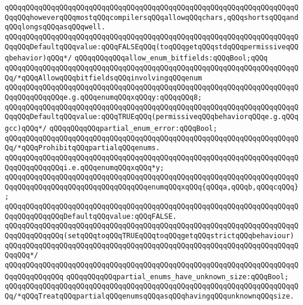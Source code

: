 \verb|qQQqqQQqqQQqqQQqqQQqqQQqqQQqqQQqqQQqqQQqqQQqqQQqqQQqqQQqqQQqqQQqqQQqqQQqqQQqhoweverqQQqmostqQQqcompilersqQQqallowqQQqchars,qQQqshortsqQQqandqQQqlongsqQQqasqQQqwell.|\newline
\verb|qQQqqQQqqQQqqQQqqQQqqQQqqQQqqQQqqQQqqQQqqQQqqQQqqQQqqQQqqQQqqQQqqQQqqQQqqQQqDefaultqQQqvalue:qQQqFALSEqQQq(toqQQqgetqQQqstdqQQqpermissiveqQQqbehavior)qQQq*/|\newline
\newline
\verb|qQQqqQQqqQQqallow_enum_bitfields:qQQqBool;qQQq|\newline
\verb|qQQqqQQqqQQqqQQqqQQqqQQqqQQqqQQqqQQqqQQqqQQqqQQqqQQqqQQqqQQqqQQqqQQqqQQq/*qQQqAllowqQQqbitfieldsqQQqinvolvingqQQqenum|\newline
\verb|qQQqqQQqqQQqqQQqqQQqqQQqqQQqqQQqqQQqqQQqqQQqqQQqqQQqqQQqqQQqqQQqqQQqqQQqqQQqqQQqqQQqe.g.qQQqenumqQQqxqQQqy:qQQqqQQq8;|\newline
\verb|qQQqqQQqqQQqqQQqqQQqqQQqqQQqqQQqqQQqqQQqqQQqqQQqqQQqqQQqqQQqqQQqqQQqqQQqqQQqDefaultqQQqvalue:qQQqTRUEqQQq(permissiveqQQqbehaviorqQQqe.g.qQQqgcc)qQQq*/|\newline
\newline
\verb|qQQqqQQqqQQqpartial_enum_error:qQQqBool;|\newline
\verb|qQQqqQQqqQQqqQQqqQQqqQQqqQQqqQQqqQQqqQQqqQQqqQQqqQQqqQQqqQQqqQQqqQQqqQQq/*qQQqProhibitqQQqpartialqQQqenums.|\newline
\verb|qQQqqQQqqQQqqQQqqQQqqQQqqQQqqQQqqQQqqQQqqQQqqQQqqQQqqQQqqQQqqQQqqQQqqQQqqQQqqQQqqQQqi.e.qQQqenumqQQqxqQQq*y;|\newline
\verb|qQQqqQQqqQQqqQQqqQQqqQQqqQQqqQQqqQQqqQQqqQQqqQQqqQQqqQQqqQQqqQQqqQQqqQQqqQQqqQQqqQQqqQQqqQQqqQQqqQQqqQQqenumqQQqxqQQq{qQQqa,qQQqb,qQQqcqQQq};|\newline
\verb|qQQqqQQqqQQqqQQqqQQqqQQqqQQqqQQqqQQqqQQqqQQqqQQqqQQqqQQqqQQqqQQqqQQqqQQqqQQqqQQqqQQqDefaultqQQqvalue:qQQqFALSE.|\newline
\verb|qQQqqQQqqQQqqQQqqQQqqQQqqQQqqQQqqQQqqQQqqQQqqQQqqQQqqQQqqQQqqQQqqQQqqQQqqQQqqQQqqQQq(setqQQqtoqQQqTRUEqQQqtoqQQqgetqQQqstrictqQQqbehaviour)|\newline
\verb|qQQqqQQqqQQqqQQqqQQqqQQqqQQqqQQqqQQqqQQqqQQqqQQqqQQqqQQqqQQqqQQqqQQqqQQqqQQq*/|\newline
\verb|qQQqqQQqqQQqqQQqqQQqqQQqqQQqqQQqqQQqqQQqqQQqqQQqqQQqqQQqqQQqqQQqqQQqqQQqqQQqqQQqqQQq|\newline
\verb|qQQqqQQqqQQqpartial_enums_have_unknown_size:qQQqBool;|\newline
\verb|qQQqqQQqqQQqqQQqqQQqqQQqqQQqqQQqqQQqqQQqqQQqqQQqqQQqqQQqqQQqqQQqqQQqqQQq/*qQQqTreatqQQqpartialqQQqenumsqQQqasqQQqhavingqQQqunknownqQQqsize.|\newline
